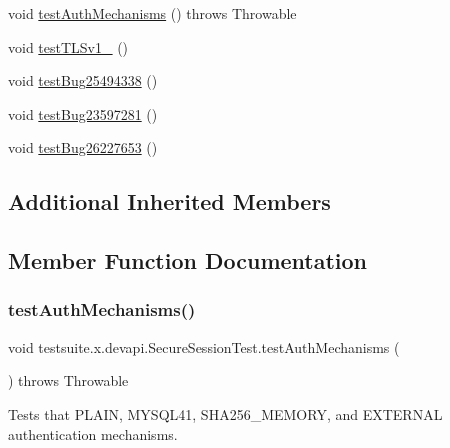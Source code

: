 \begin{DoxyCompactItemize}
\item 
void \mbox{\hyperlink{classtestsuite_1_1x_1_1devapi_1_1_secure_session_test_a8d3f3c54a0170233b5c1fc60dc14e163}{test\+Auth\+Mechanisms}} ()  throws Throwable 
\item 
void \mbox{\hyperlink{classtestsuite_1_1x_1_1devapi_1_1_secure_session_test_a4bb7f7f9d1601519d8ff7ee0ec796360}{test\+T\+L\+Sv1\+\_}} ()
\item 
void \mbox{\hyperlink{classtestsuite_1_1x_1_1devapi_1_1_secure_session_test_afca505f06685ed0d91a8d30984491d6a}{test\+Bug25494338}} ()
\item 
void \mbox{\hyperlink{classtestsuite_1_1x_1_1devapi_1_1_secure_session_test_a30cc42accb4ad16995c0dd39d7e78c3b}{test\+Bug23597281}} ()
\item 
void \mbox{\hyperlink{classtestsuite_1_1x_1_1devapi_1_1_secure_session_test_a09acd3b7e647dbedb76f433a23d11b31}{test\+Bug26227653}} ()
\end{DoxyCompactItemize}
\subsection*{Additional Inherited Members}


\subsection{Member Function Documentation}
\mbox{\label{classtestsuite_1_1x_1_1devapi_1_1_secure_session_test_a8d3f3c54a0170233b5c1fc60dc14e163}} 
\subsubsection{\texorpdfstring{test\+Auth\+Mechanisms()}{testAuthMechanisms()}}
{\footnotesize\ttfamily void testsuite.\+x.\+devapi.\+Secure\+Session\+Test.\+test\+Auth\+Mechanisms (\begin{DoxyParamCaption}{ }\end{DoxyParamCaption}) throws Throwable}

Tests that P\+L\+A\+IN, M\+Y\+S\+Q\+L41, S\+H\+A256\+\_\+\+M\+E\+M\+O\+RY, and E\+X\+T\+E\+R\+N\+AL authentication mechanisms.


